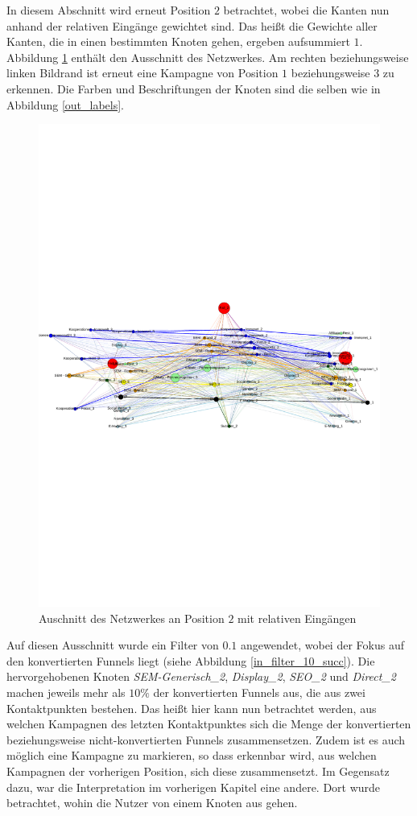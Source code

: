 In diesem Abschnitt wird erneut Position $2$ betrachtet, wobei die Kanten nun anhand der relativen Eingänge gewichtet sind. Das heißt die Gewichte aller Kanten, die in einen bestimmten Knoten gehen, ergeben aufsummiert $1$. Abbildung \ref{in_labels} enthält den Ausschnitt des Netzwerkes. Am rechten beziehungsweise linken Bildrand ist erneut eine Kampagne von Position $1$ beziehungsweise $3$ zu erkennen. Die Farben und Beschriftungen der Knoten sind die selben wie in Abbildung \ref{out_labels}. 
\begin{figure}[H]
	\centering\includegraphics[scale=1]{in_labels.pdf}\caption[Relative Eingänge]{Auschnitt des Netzwerkes an Position $2$ mit relativen Eingängen}\label{in_labels}
\end{figure}
Auf diesen Ausschnitt wurde ein Filter von $0.1$ angewendet, wobei der Fokus auf den konvertierten Funnels liegt (siehe Abbildung \ref{in_filter_10_succ}). Die hervorgehobenen Knoten \textit{SEM-Generisch\_2}, \textit{Display\_2}, \textit{SEO\_2} und \textit{Direct\_2} machen jeweils mehr als $10 \%$ der konvertierten Funnels aus, die aus zwei Kontaktpunkten bestehen. Das heißt hier kann nun betrachtet werden, aus welchen Kampagnen des letzten Kontaktpunktes sich die Menge der konvertierten beziehungsweise nicht-konvertierten Funnels zusammensetzen. Zudem ist es auch möglich eine Kampagne zu markieren, so dass erkennbar wird, aus welchen Kampagnen der vorherigen Position, sich diese zusammensetzt. Im Gegensatz dazu, war die Interpretation im vorherigen Kapitel eine andere. Dort wurde betrachtet, wohin die Nutzer von einem Knoten aus gehen.
